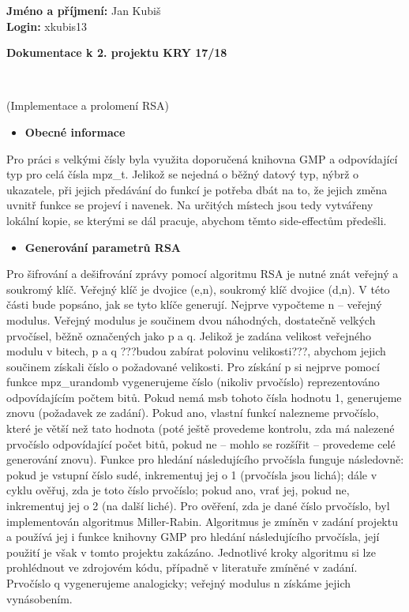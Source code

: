 \documentclass[11pt,a4paper]{article}
\begin{document}
\noindent \textbf{Jméno a příjmení:} Jan Kubiš\\
\textbf{Login:} xkubis13\\
\smallskip
\begin{center}
	\begin{LARGE}\textbf{Dokumentace k 2. projektu KRY 17/18}\end{LARGE}\\
	\begin{large}(Implementace a prolomení RSA)\end{large}
\end{center}
\bigskip

\begin{itemize}[leftmargin=0cm]
\item{\textbf{Obecné informace}}
\end{itemize}
Pro práci s velkými čísly byla využita doporučená knihovna GMP a odpovídající typ pro celá čísla mpz\_t. Jelikož se nejedná o běžný datový typ, nýbrž o ukazatele, při jejich předávání do funkcí je potřeba dbát na to, že jejich změna uvnitř funkce se projeví i navenek. Na určitých místech jsou tedy vytvářeny lokální kopie, se kterými se dál pracuje, abychom těmto side-effectům předešli.


\begin{itemize}[leftmargin=0cm]
\item{\textbf{Generování parametrů RSA}}
\end{itemize}
Pro šifrování a dešifrování zprávy pomocí algoritmu RSA je nutné znát veřejný a soukromý klíč. Veřejný klíč je dvojice (e,n), soukromý klíč dvojice (d,n). V této části bude popsáno, jak se tyto klíče generují. Nejprve vypočteme n -- veřejný modulus. Veřejný modulus je součinem dvou náhodných, dostatečně velkých prvočísel, běžně označených jako p a q. Jelikož je zadána velikost veřejného modulu v bitech, p a q ???budou zabírat polovinu velikosti???, abychom jejich součinem získali číslo o požadované velikosti. Pro získání p si nejprve pomocí funkce mpz\_urandomb vygenerujeme číslo (nikoliv prvočíslo) reprezentováno odpovídajícím počtem bitů. Pokud nemá msb tohoto čísla hodnotu 1, generujeme znovu (požadavek ze zadání). Pokud ano, vlastní funkcí nalezneme prvočíslo, které je větší než tato hodnota (poté ještě provedeme kontrolu, zda má nalezené prvočíslo odpovídající počet bitů, pokud ne -- mohlo se rozšířit -- provedeme celé generování znovu). Funkce pro hledání následujícího prvočísla funguje následovně: pokud je vstupní číslo sudé, inkrementuj jej o 1 (prvočísla jsou lichá); dále v cyklu ověřuj, zda je toto číslo prvočíslo; pokud ano, vrať jej, pokud ne, inkrementuj jej o 2 (na další liché). Pro ověření, zda je dané číslo prvočíslo, byl implementován algoritmus Miller-Rabin. Algoritmus je zmíněn v zadání projektu a používá jej i funkce knihovny GMP pro hledání následujícího prvočísla, její použití je však v tomto projektu zakázáno. Jednotlivé kroky algoritmu si lze prohlédnout ve zdrojovém kódu, případně v literatuře zmíněné v zadání. Prvočíslo q vygenerujeme analogicky; veřejný modulus n získáme jejich vynásobením.
\end{document}
